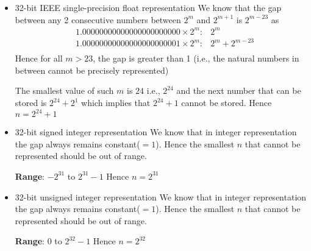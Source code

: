\documentclass{article}
\begin{document}
\begin{itemize}
\item 32-bit IEEE single-precision float representation\newline\newline
  We know that the gap between any 2 consecutive numbers between $2^m$ and $2^{m + 1}$ is $2^{m - 23}$ as
\begin{align*}
  &1.00000000000000000000000 \times 2^m: &2^m\\
  &1.00000000000000000000001 \times 2^m: &2^m + 2^{m - 23}\\
\end{align*}
Hence for all $m > 23$, the gap is greater than 1 (i.e., the natural numbers in between cannot be precisely represented)\newline

The smallest value of such $m$ is $24$ i.e., $2^{24}$ and the next number that can be stored is $2^{24} + 2^1$ which implies that $2^{24} + 1$ cannot be stored. Hence $n = 2^{24} + 1$\newline\newline

\item 32-bit signed integer representation\newline\newline
  We know that in integer representation the gap always remains constant($= 1$).\newline
  Hence the smallest $n$ that cannot be represented should be out of range.\newline

  \textbf{Range}: $-2^{31}$ to $2^{31} - 1$\newline
  Hence $n = 2^{31}$\newline\newline

\item 32-bit unsigned integer representation\newline\newline
  We know that in integer representation the gap always remains constant($= 1$).\newline
  Hence the smallest $n$ that cannot be represented should be out of range.\newline

  \textbf{Range}: $0$ to $2^{32} - 1$\newline
  Hence $n = 2^{32}$\newline
\end{itemize}
\end{document}
